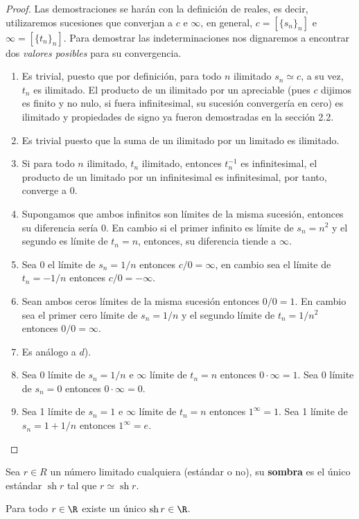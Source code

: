 \documentclass[11pt,oneside,a4paper]{book}
\DeclareMathOperator{\sh}{sh}
\begin{document}
\begin{proof}
Las demostraciones se harán con la definición de reales, es decir, utilizaremos sucesiones que converjan a $c$ e $\infty$, en general, $c=[\{s_n\}_n]$ e $\infty=[\{t_n\}_n]$. Para demostrar las indeterminaciones nos dignaremos a encontrar dos \textit{valores posibles} para su convergencia.
\begin{enumerate}[$a$)]
\item Es trivial, puesto que por definición, para todo $n$ ilimitado $s_n\simeq c$, a su vez, $t_n$ es ilimitado. El producto de un ilimitado por un apreciable (pues $c$ dijimos es finito y no nulo, si fuera infinitesimal, su sucesión convergería en cero) es ilimitado y propiedades de signo ya fueron demostradas en la sección 2.2.
\item Es trivial puesto que la suma de un ilimitado por un limitado es ilimitado.
\item Si para todo $n$ ilimitado, $t_n$ ilimitado, entonces $t_n^{-1}$ es infinitesimal, el producto de un limitado por un infinitesimal es infinitesimal, por tanto, converge a 0.
\item Supongamos que ambos infinitos son límites de la misma sucesión, entonces su diferencia sería 0. En cambio si el primer infinito es límite de $s_n=n^2$ y el segundo es límite de $t_n=n$, entonces, su diferencia tiende a $\infty$.
\item Sea 0 el límite de $s_n=1/n$ entonces $c/0=\infty$, en cambio sea el límite de $t_n=-1/n$ entonces $c/0=-\infty$.
\item Sean ambos ceros límites de la misma sucesión entonces $0/0=1$. En cambio sea el primer cero límite de $s_n=1/n$ y el segundo límite de $t_n=1/n^2$ entonces $0/0=\infty$.
\item Es análogo a $d$).
\item Sea 0 límite de $s_n=1/n$ e $\infty$ límite de $t_n=n$ entonces $0\cdot\infty=1$. Sea 0 límite de $s_n=0$ entonces $0\cdot\infty=0$.
\item Sea 1 límite de $s_n=1$ e $\infty$ límite de $t_n=n$ entonces $1^\infty=1$. Sea 1 límite de $s_n=1+1/n$ entonces $1^\infty=e$.
\end{enumerate}
\end{proof}
\begin{mydef}[Sombra]
Sea $r\in R$ un número limitado cualquiera (estándar o no), su \textbf{sombra} es el único estándar $\sh r$ tal que $r\simeq\sh r$.
\end{mydef}
\begin{thm}
Para todo $r\in\R$ existe un único $\sh r\in\R$.
\end{thm}
\end{document}
